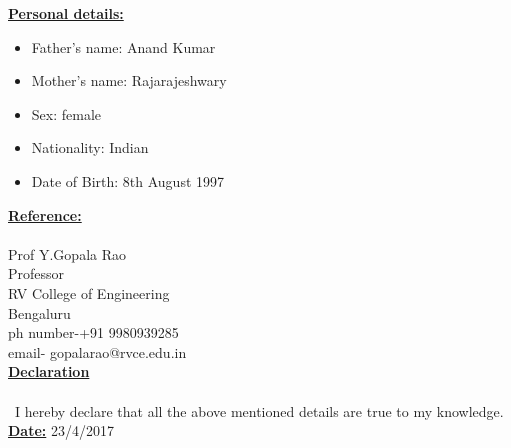 \documentclass[10pt]{article}
\begin{document}
\underline{\textbf{\Large{Personal details:}}}
\begin{itemize}
	\item{Father's name: Anand Kumar}
	\item{Mother's name: Rajarajeshwary}
	\item{Sex: female} 
	\item{Nationality: Indian} 
	\item{Date of Birth: 8th August 1997} 
\end{itemize}
\hfill

\underline{\textbf{\Large{Reference:}}} \\\\
Prof Y.Gopala Rao\\
Professor\\
RV College of Engineering\\
Bengaluru\\
ph number-+91 9980939285\\
email- gopalarao@rvce.edu.in
\hfill\\

\underline{\textbf{\Large{Declaration}}} \\\\
\hspace{8cm}
\ I hereby declare that all the above mentioned details are true to my knowledge.
\hfill\\

\underline{\textbf{\large{Date:}}}  23/4/2017
\end{document}
